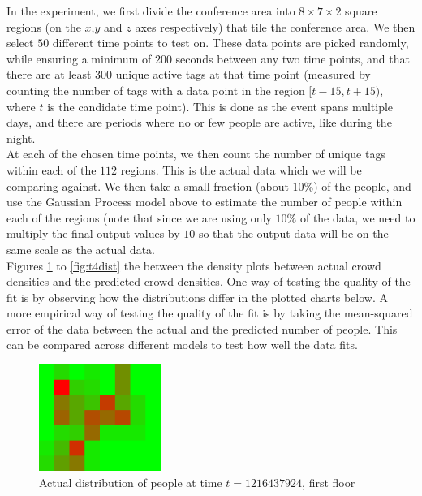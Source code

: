 \documentclass[letterpaper]{article}
\begin{document}
In the experiment, we first divide the conference area into $8\times 7 \times 2$ square regions (on the $x$,$y$ and $z$ axes respectively) that tile the conference area. We then select $50$ different time points to test on. These data points are picked randomly, while ensuring a minimum of $200$ seconds between any two time points, and that there are at least $300$ unique active tags at that time point (measured by counting the number of tags with a data point in the region $[t-15,t+15)$, where $t$ is the candidate time point). This is done as the event spans multiple days, and there are periods where no or few people are active, like during the night.\\

At each of the chosen time points, we then count the number of unique tags within each of the $112$ regions. This is the actual data which we will be comparing against. We then take a small fraction (about $10\%$) of the people, and use the Gaussian Process model above to estimate the number of people within each of the regions (note that since we are using only $10\%$ of the data, we need to multiply the final output values by $10$ so that the output data will be on the same scale as the actual data. \\

Figures \ref{fig:t1dist} to \ref{fig:t4dist} the between the density plots between actual crowd densities and the predicted crowd densities. One way of testing the quality of the fit is by observing how the distributions differ in the plotted charts below. A more empirical way of testing the quality of the fit is by taking the mean-squared error of the data between the actual and the predicted number of people. This can be compared across different models to test how well the data fits. \\

\begin{figure}[h!]
  \centering
    \includegraphics[width=150px,natwidth=320,natheight=280]{selected_renders/0_1216437924.png}
  \caption{Actual distribution of people at time $t=1216437924$, first floor}
  \label{fig:t1dist}
\end{figure}
\end{document}

